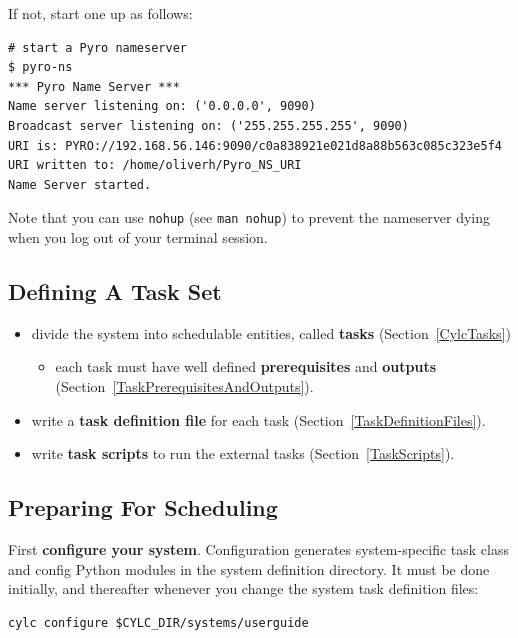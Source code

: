 \documentclass[11pt,a4paper]{article}
\begin{document}
If not, start one up as follows:

\begin{lstlisting}
# start a Pyro nameserver
$ pyro-ns
*** Pyro Name Server ***
Name server listening on: ('0.0.0.0', 9090)
Broadcast server listening on: ('255.255.255.255', 9090)
URI is: PYRO://192.168.56.146:9090/c0a838921e021d8a88b563c085c323e5f4
URI written to: /home/oliverh/Pyro_NS_URI
Name Server started.
\end{lstlisting}

Note that you can use \lstinline=nohup= (see \lstinline=man nohup=) to
prevent the nameserver dying when you log out of your terminal session.

\subsection{Defining A Task Set} 
\label{QuickDefiningATaskSet}

\begin{itemize}
    \item divide the system into schedulable entities, called {\bf tasks}
        (Section~\ref{CylcTasks})
        
    \begin{itemize}
        \item each task must have well defined {\bf prerequisites} and {\bf
            outputs} (Section~\ref{TaskPrerequisitesAndOutputs}).
    \end{itemize}

    \item write a {\bf task definition file} for each task
        (Section~\ref{TaskDefinitionFiles}).

    \item write {\bf task scripts} to run the external tasks
        (Section~\ref{TaskScripts}).
\end{itemize}

\subsection{Preparing For Scheduling}
\label{QuickPreparingForScheduling}

First {\bf configure your system}. Configuration generates
system-specific task class and config Python modules in the system
definition directory. It must be done initially, and thereafter whenever
you change the system task definition files:

\begin{lstlisting}
cylc configure $CYLC_DIR/systems/userguide
\end{lstlisting}
\end{document}
